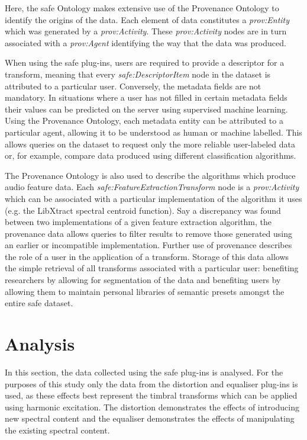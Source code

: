 		Here, the \acrshort{safe} Ontology makes extensive use of the Provenance Ontology \citep{provenance} to
		identify the origins of the data.  Each element of data constitutes a \emph{prov:Entity} which was
		generated by a \emph{prov:Activity}. These \emph{prov:Activity} nodes are in turn associated with a
		\emph{prov:Agent} identifying the way that the data was produced.

		When using the \acrshort{safe} plug-ins, users are required to provide a descriptor for a transform,
		meaning that every \emph{safe:DescriptorItem} node in the dataset is attributed to a particular user.
		Conversely, the metadata fields are not mandatory. In situations where a user has not filled in certain
		metadata fields their values can be predicted on the server using supervised machine learning. Using the
		Provenance Ontology, each metadata entity can be attributed to a particular agent, allowing it to be
		understood as human or machine labelled. This allows queries on the dataset to request only the more
		reliable user-labeled data or, for example, compare data produced using different classification
		algorithms.

		The Provenance Ontology is also used to describe the algorithms which produce audio feature data. Each
		\emph{safe:FeatureExtractionTransform} node is a \emph{prov:Activity} which can be associated with a
		particular implementation of the algorithm it uses (e.g. the LibXtract \citep{bullock2007libxtract}
		spectral centroid function). Say a discrepancy was found between two implementations of a given feature
		extraction algorithm, the provenance data allows queries to filter results to remove those generated using
		an earlier or incompatible implementation. Further use of provenance describes the role of a user in the
		application of a transform. Storage of this data allows the simple retrieval of all transforms associated
		with a particular user: benefiting researchers by allowing for segmentation of the data and benefiting
		users by allowing them to maintain personal libraries of semantic presets amongst the entire
		\acrshort{safe} dataset.

\section{Analysis}
\label{sec:TimbreEvaluation-Analysis}
	In this section, the data collected using the \acrshort{safe} plug-ins is analysed. For the purposes of this study
	only the data from the distortion and equaliser plug-ins is used, as these effects best represent the timbral
	transforms which can be applied using harmonic excitation. The distortion demonstrates the effects of introducing
	new spectral content and the equaliser demonstrates the effects of manipulating the existing spectral content.


